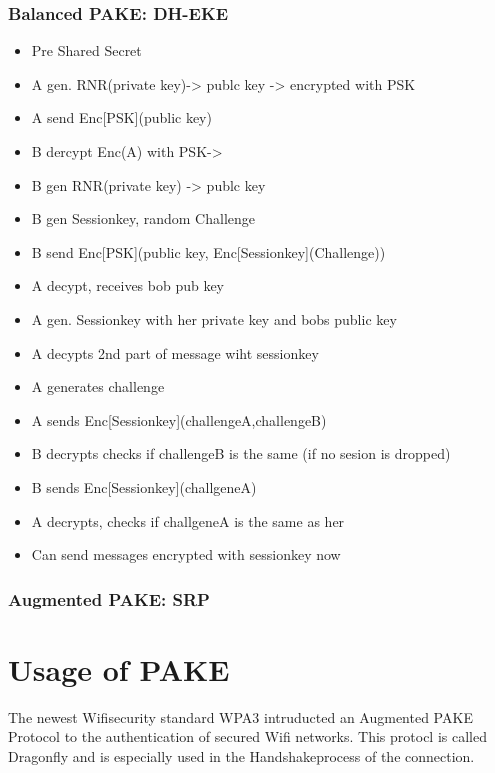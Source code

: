\documentclass[journal]{IEEEtran}
\begin{document}
\subsubsection{Balanced PAKE: DH-EKE}
    \begin{itemize}[]
        \item  Pre Shared Secret
        \item  A gen. RNR(private key)-> publc key -> encrypted with PSK
        \item  A send Enc[PSK](public key)
        \item  B dercypt  Enc(A) with PSK->
        \item  B gen RNR(private key) -> publc key
        \item  B gen Sessionkey, random Challenge 
        \item  B send Enc[PSK](public key,  Enc[Sessionkey](Challenge))
        \item  A decypt, receives bob pub key
        \item  A gen. Sessionkey with her private key and bobs public key
        \item  A decypts 2nd part of message wiht sessionkey
        \item  A generates challenge
        \item  A sends Enc[Sessionkey](challengeA,challengeB)
        \item  B decrypts checks if challengeB is the same (if no sesion is dropped)
        \item  B sends Enc[Sessionkey](challgeneA)
        \item  A decrypts, checks if challgeneA is the same as her 
        \item  Can send messages encrypted with sessionkey now
    \end{itemize}
\subsubsection{Augmented PAKE: SRP}

\section{Usage of PAKE}
The newest Wifisecurity standard WPA3 intruducted an Augmented PAKE Protocol to the authentication of secured Wifi networks.
This protocl is called Dragonfly and is especially used in the Handshakeprocess of the connection.
\end{document}
